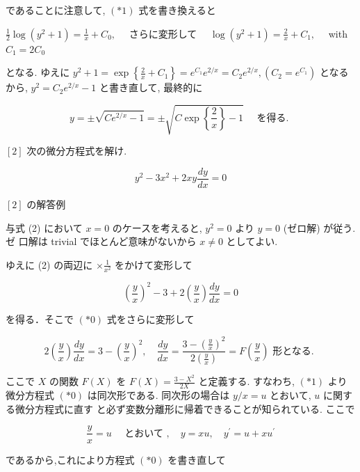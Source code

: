 \documentclass[10pt]{article}
\begin{document}
であることに注意して, $(* 1)$ 式を書き換えると

$\frac{1}{2} \log \left(y^{2}+1\right)=\frac{1}{x}+C_{0}, \quad$ さらに変形して $\quad \log \left(y^{2}+1\right)=\frac{2}{x}+C_{1}, \quad$ with $C_{1}=2 C_{0}$

となる. ゆえに $y^{2}+1=\exp \left\{\frac{2}{x}+C_{1}\right\}=e^{C_{1}} e^{2 / x}=C_{2} e^{2 / x},\left(C_{2}=e^{C_{1}}\right)$ となるから, $y^{2}=C_{2} e^{2 / x}-1$ と書き直して, 最終的に

$$
y= \pm \sqrt{C e^{2 / x}-1}= \pm \sqrt{C \exp \left\{\frac{2}{x}\right\}-1} \quad \text { を得る. }
$$

$[2]$ 次の微分方程式を解け.


\begin{equation*}
y^{2}-3 x^{2}+2 x y \frac{d y}{d x}=0 \tag{2}
\end{equation*}


$[2]$ の解答例

与式 (2) において $x=0$ のケースを考えると, $y^{2}=0$ より $y=0$ (ゼロ解) が従う.ゼ 口解は trivial でほとんど意味がないから $x \neq 0$ としてよい.

ゆえに (2) の両辺に $\times \frac{1}{x^{2}}$ をかけて変形して


\begin{equation*}
\left(\frac{y}{x}\right)^{2}-3+2\left(\frac{y}{x}\right) \frac{d y}{d x}=0 \tag{*0}
\end{equation*}


を得る．そこで $(* 0)$ 式をさらに変形して


\begin{equation*}
2\left(\frac{y}{x}\right) \frac{d y}{d x}=3-\left(\frac{y}{x}\right)^{2}, \quad \frac{d y}{d x}=\frac{3-\left(\frac{y}{x}\right)^{2}}{2\left(\frac{y}{x}\right)}=F\left(\frac{y}{x}\right) \text { 形となる. } \tag{*1}
\end{equation*}


ここで $X$ の関数 $F(X)$ を $F(X)=\frac{3-X^{2}}{2 X}$ と定義する. すなわち, $(* 1)$ より微分方程式 $(* 0)$ は同次形である. 同次形の場合は $y / x=u$ とおいて, $u$ に関する微分方程式に直す と必ず変数分離形に帰着できることが知られている. ここで


\begin{equation*}
\frac{y}{x}=u \quad \text { とおいて }, \quad y=x u, \quad y^{\prime}=u+x u^{\prime} \tag{*2}
\end{equation*}


であるから,これにより方程式 $(* 0)$ を書き直して
\end{document}
